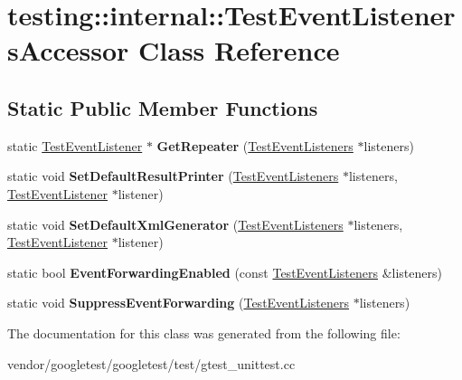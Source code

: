 \hypertarget{classtesting_1_1internal_1_1_test_event_listeners_accessor}{}\section{testing\+:\+:internal\+:\+:Test\+Event\+Listeners\+Accessor Class Reference}
\label{classtesting_1_1internal_1_1_test_event_listeners_accessor}
\subsection*{Static Public Member Functions}
\begin{DoxyCompactItemize}
\item 
\mbox{\label{classtesting_1_1internal_1_1_test_event_listeners_accessor_a07c6f8644e509d0f23c0c16a60856387}} 
static \hyperlink{classtesting_1_1_test_event_listener}{Test\+Event\+Listener} $\ast$ {\bfseries Get\+Repeater} (\hyperlink{classtesting_1_1_test_event_listeners}{Test\+Event\+Listeners} $\ast$listeners)
\item 
\mbox{\label{classtesting_1_1internal_1_1_test_event_listeners_accessor_ac8886c7cea5a4ad39aed276d3f58da75}} 
static void {\bfseries Set\+Default\+Result\+Printer} (\hyperlink{classtesting_1_1_test_event_listeners}{Test\+Event\+Listeners} $\ast$listeners, \hyperlink{classtesting_1_1_test_event_listener}{Test\+Event\+Listener} $\ast$listener)
\item 
\mbox{\label{classtesting_1_1internal_1_1_test_event_listeners_accessor_a8c04463b5ba5ee6d6da36e2171c7fff0}} 
static void {\bfseries Set\+Default\+Xml\+Generator} (\hyperlink{classtesting_1_1_test_event_listeners}{Test\+Event\+Listeners} $\ast$listeners, \hyperlink{classtesting_1_1_test_event_listener}{Test\+Event\+Listener} $\ast$listener)
\item 
\mbox{\label{classtesting_1_1internal_1_1_test_event_listeners_accessor_a4a7522557045cb55eb037dc61429d71c}} 
static bool {\bfseries Event\+Forwarding\+Enabled} (const \hyperlink{classtesting_1_1_test_event_listeners}{Test\+Event\+Listeners} \&listeners)
\item 
\mbox{\label{classtesting_1_1internal_1_1_test_event_listeners_accessor_abfc0a0f8163465f4f5d42436ec8c7cb3}} 
static void {\bfseries Suppress\+Event\+Forwarding} (\hyperlink{classtesting_1_1_test_event_listeners}{Test\+Event\+Listeners} $\ast$listeners)
\end{DoxyCompactItemize}


The documentation for this class was generated from the following file\+:\begin{DoxyCompactItemize}
\item 
vendor/googletest/googletest/test/gtest\+\_\+unittest.\+cc\end{DoxyCompactItemize}
